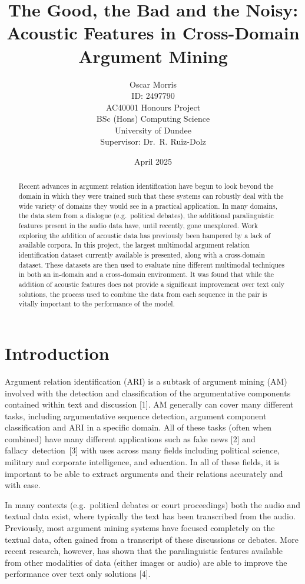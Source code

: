 \documentclass[twocolumn]{article}
\title{The Good, the Bad and the Noisy: Acoustic Features in
Cross-Domain Argument Mining}
\author{Oscar
Morris\\ID: 2497790\\AC40001 Honours Project\\BSc (Hons) Computing Science\\University of Dundee\\Supervisor: Dr.~R.
Ruiz-Dolz}
\date{April 2025\vspace{5ex}}
\begin{document}
\maketitle
\raggedbottom


\begin{abstract}
Recent advances in argument relation identification have begun to look
beyond the domain in which they were trained such that these systems can
robustly deal with the wide variety of domains they would see in a
practical application. In many domains, the data stem from a dialogue
(e.g.~political debates), the additional paralinguistic features present
in the audio data have, until recently, gone unexplored. Work exploring
the addition of acoustic data has previously been hampered by a lack of
available corpora. In this project, the largest multimodal argument
relation identification dataset currently available is presented, along with a
cross-domain dataset. These datasets are then used to evaluate nine
different multimodal techniques in both an in-domain and a cross-domain
environment. It was found that while the addition of acoustic features
does not provide a significant improvement over text only solutions, the
process used to combine the data from each sequence in the pair is
vitally important to the performance of the model.
\end{abstract}


\section{Introduction}\label{introduction}

Argument relation identification (ARI) is a subtask of argument mining
(AM) involved with the detection and classification of the argumentative
components contained within text and discussion {[}1{]}. AM generally
can cover many different tasks, including argumentative sequence
detection, argument component classification and ARI in a specific
domain. All of these tasks (often when combined) have many different
applications such as fake news {[}2{]} and \mbox{fallacy detection {[}3{]}}
with uses across many fields including political science, military and
corporate intelligence, and education. In all of these fields, it is
important to be able to extract arguments and their relations accurately
and with ease.

In many contexts (e.g.~political debates or court proceedings) both the
audio and textual data exist, where typically the text has been
transcribed from the audio. Previously, most argument mining systems
have focused completely on the textual data, often gained from a
transcript of these discussions or debates. More recent research,
however, has shown that the paralinguistic features available from other
modalities of data (either images or audio) are able to improve the
performance over text only solutions {[}4{]}.
\end{document}
